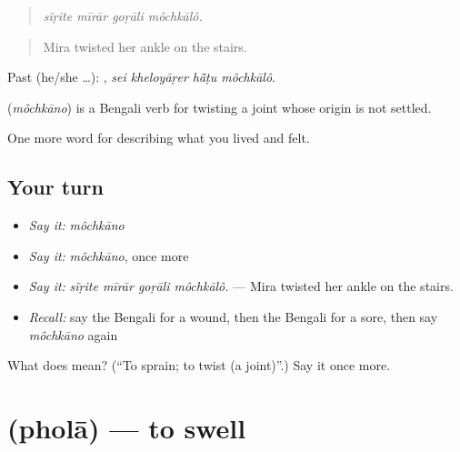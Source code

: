 \begin{quote}
   
\end{quote}

\begin{quote}
\emph{sĩṛite mīrār goṛāli môchkālô.}
\end{quote}

\begin{quote}
Mira twisted her ankle on the stairs.
\end{quote}

Past (he/she …):    , \emph{sei kheloyāṛer hā̃ṭu môchkālô}.

\begin{cousinweb}
\textbf{} (\emph{môchkāno}) is a Bengali verb for twisting a joint whose origin is not settled.
\end{cousinweb}

\begin{grammarlens}[title={What you've built}]
One more word for describing what you lived and felt.
\end{grammarlens}

\subsection*{Your turn}
\begin{itemize}
\raggedright
  \item \emph{Say it:} \emph{môchkāno}
  \item \emph{Say it:} \emph{môchkāno}, once more
  \item \emph{Say it:} \emph{sĩṛite mīrār goṛāli môchkālô.} — Mira twisted her ankle on the stairs.
  \item \emph{Recall:} say the Bengali for a wound, then the Bengali for a sore, then say \emph{môchkāno} again
\end{itemize}

\begin{tcolorbox}[breakable,colback=teal!4,colframe=teal!35!black,title={Before you move on}]
What does  mean? (\textquotedblleft{}To sprain; to twist (a joint)\textquotedblright{}.) Say it once more.
\end{tcolorbox}
\section[\texorpdfstring{\bn{ফোলা} (pholā)}{ফোলা (pholā)}]{ (pholā) — to swell}

